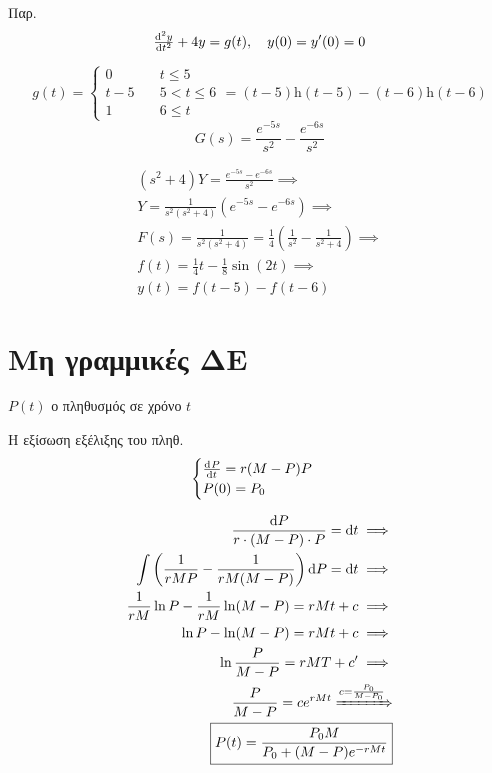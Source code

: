 \documentclass[11pt,a4paper,titlepage,final]{article}
\begin{document}
\begin{exercise*}{Παρ.}
\[
\od[2]{y}{t}+4y = g(t),\quad y(0)=y'(0)=0
\]

\tcblower
\[
g(t) = \begin{cases}
0\quad & t \leq 5 \\
t-5\quad & 5 < t \leq 6 \\
1\quad & 6 \leq t
\end{cases} =
(t-5) \mathrm h(t-5) - (t-6)\mathrm h(t-6)
\]
\[
G(s) = \frac{e^{-5s}}{s^2}-\frac{e^{-6s}}{s^2}
\]

\begin{align*}
(s^2+4)Y = \frac{e^{-5s}-e^{-6s}}{s^2} \implies \\
Y = \frac{1}{s^2(s^2+4)}(e^{-5s}-e^{-6s}) \implies \\
F(s) = \frac{1}{s^2(s^2+4)} = \frac{1}{4} \left(\frac{1}{s^2}-\frac{1}{s^2+4} \right) \implies \\
\boxed{f(t)=\frac{1}{4}t-\frac{1}{8}\sin(2t)} \implies \\
y(t)=f(t-5)-f(t-6)
\end{align*}
\end{exercise*}

\section{Μη γραμμικές ΔΕ}
\( P(t) \) ο πληθυσμός σε χρόνο \( t \)

Η εξίσωση εξέλιξης του πληθ.
\[
\begin{cases}
\od{P}{t} = r(M-P)P \\
P(0) = P_0
\end{cases}
\]

\begin{wrapfigure}[3]{R}{0.5\textwidth}
\centering
{}
\end{wrapfigure}
\leavevmode
\begin{align*}
\frac{\dif P}{r\cdot(M-P)\cdot P} =\dif t \implies \\
\int \left( \frac{1}{rMP} - \frac{1}{rM(M-P)}\right) \dif P = \dif t \implies \\
\frac{1}{rM}\ln P - \frac{1}{rM} \ln(M-P) = rMt+c \implies \\
\ln P - \ln(M-P) = rMt + c \implies \\
\ln \frac{P}{M-P} = rMT+c' \implies \\
\frac{P}{M-P} = ce^{rMt} \xRightarrow{c=\frac{P_0}{M-P_0}} \\
\boxed{P(t) = \frac{P_0M}{P_0+(M-P)e^{-rMt}}}
\end{align*}
\end{document}
